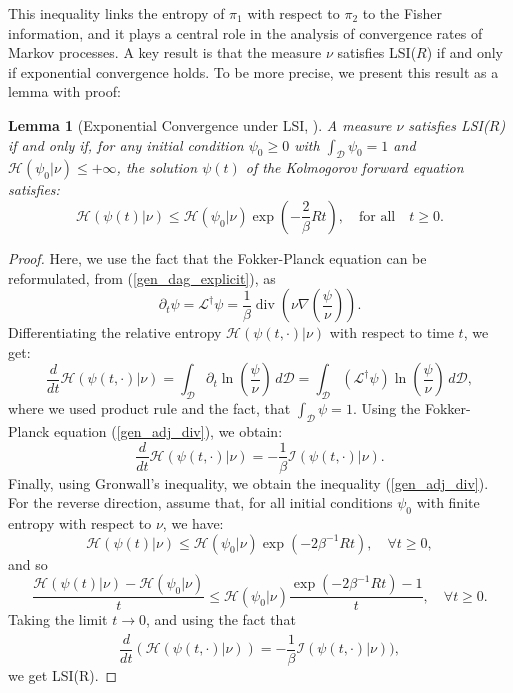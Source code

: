 \documentclass[11pt, twoside]{report}
\newtheorem{lemma}[theorem]{Lemma}
\begin{document}
This inequality links the entropy of $\pi_1$ with respect to $\pi_2$ to the Fisher information, and it plays a central role in the analysis of convergence rates of Markov processes. A key result is that the measure $\nu$ satisfies LSI($R$) if and only if exponential convergence holds. To be more precise, we present this result as a lemma with proof:
\begin{lemma}[Exponential Convergence under LSI, \texorpdfstring{\cite[Proposition~2.9]{Lelievre2016-hx}}{}]
A measure $\nu$ satisfies LSI($R$) if and only if, for any initial condition $\psi_0 \geq 0$ with $\int_\mathcal{D} \psi_0 = 1$ and $\mathcal{H}(\psi_0 | \nu) \leq +\infty$, the solution $\psi(t)$ of the Kolmogorov forward equation satisfies:
\begin{equation} \label{LSI_exponential}
    \mathcal{H}(\psi(t) | \nu) \leq \mathcal{H}(\psi_0 | \nu) \exp\left(-\frac{2}{\beta}Rt\right), \quad \text{for all} \quad t \geq 0.
\end{equation}
\end{lemma}
\begin{proof}
    Here, we use the fact that the Fokker-Planck equation can be reformulated, from (\ref{gen_dag_explicit}), as 
    \begin{equation} \label{gen_adj_div}
        \partial_t \psi=\mathcal{L}^{\dagger} \psi=\frac{1}{\beta} \operatorname{div}\left(\nu \nabla\left(\frac{\psi}{\nu}\right)\right) .
    \end{equation}
    Differentiating the relative entropy $\mathcal{H}(\psi(t,\cdot) | \nu)$ with respect to time $t$, we get:
    \[
    \frac{d}{dt} \mathcal{H}(\psi(t,\cdot) | \nu) = \int_{\mathcal{D}} \partial_t \ln{\left( \frac{\psi}{\nu} \right)} \, d\mathcal{D} = \int_{\mathcal{D}} (\mathcal{L}^\dagger \psi) \ln{\left( \frac{\psi}{\nu} \right)} \, d\mathcal{D},
    \]
    where we used product rule and the fact, that $\int_{\mathcal{D}} \psi = 1$.%
    Using the Fokker-Planck equation (\ref{gen_adj_div}), we obtain:
    \[
    \frac{d}{dt} \mathcal{H}(\psi(t,\cdot) | \nu) = -\frac{1}{\beta} \mathcal{I}(\psi(t,\cdot) | \nu).\]Finally, using Gronwall's inequality, we obtain the inequality (\ref{gen_adj_div}). For the reverse direction, assume that, for all initial conditions $\psi_0$ with finite entropy with respect to $\nu$, we have:
    \[
    \mathcal{H}(\psi(t) | \nu) \leq \mathcal{H}(\psi_0 | \nu) \exp(-2\beta^{-1}Rt), \quad \forall t \geq 0,
    \]
    and so
    \[\frac{\mathcal{H}(\psi(t) | \nu) - \mathcal{H}(\psi_0 | \nu)}{t} \leq \mathcal{H}(\psi_0 | \nu) \frac{\exp(-2\beta^{-1}Rt) - 1}{t}, \quad \forall t \geq 0.\]
    Taking the limit $t \xrightarrow[]{} 0$, and using the fact that
    \[\frac{d}{dt}(\mathcal{H}(\psi(t,\cdot)|\nu)) = -\frac{1}{\beta} \mathcal{I}(\psi(t,\cdot)|\nu)),\]
    we get LSI(R).
\end{proof}
\end{document}
